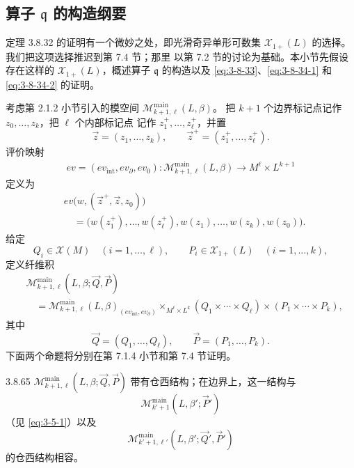 
\subsection{算子 \texorpdfstring{$\mathfrak q$}{q} 的构造纲要}
\label{subsec:3-8-6}

定理 3.8.32 的证明有一个微妙之处，即光滑奇异单形可数集
$\mathcal X_{1+}(L)$ 的选择。我们把这项选择推迟到第 7.4 节；那里
以第 7.2 节的讨论为基础。本小节先假设存在这样的
$\mathcal X_{1+}(L)$，概述算子 $\mathfrak q$ 的构造以及
\eqref{eq:3-8-33}、\eqref{eq:3-8-34-1} 和
\eqref{eq:3-8-34-2} 的证明。

考虑第 2.1.2 小节引入的模空间
$\mathcal M_{k+1,\ell}^{\mathrm{main}}(L,\beta)$。
把 $k+1$ 个边界标记点记作 $z_0,\ldots,z_k$，把 $\ell$ 个内部标记点
记作 $z_1^+,\ldots,z_\ell^+$，并置
\[
 \vec z=(z_1,\ldots,z_k),
 \qquad
 \vec z^+=(z_1^+,\ldots,z_\ell^+).
\]
评价映射
\[
\begin{aligned}
 ev=(ev_{\mathrm{int}},ev_\partial,ev_0)\colon
 \mathcal M_{k+1,\ell}^{\mathrm{main}}(L,\beta)
 \longrightarrow M^\ell\times L^{k+1}
\end{aligned}
\]
定义为
\[
\begin{aligned}
 &ev\bigl(w,(\vec z^+,\vec z,z_0)\bigr)\\
 &\quad=
 \bigl(
 w(z_1^+),\ldots,w(z_\ell^+),
 w(z_1),\ldots,w(z_k),w(z_0)
 \bigr).
\end{aligned}
\]
给定
\[
 Q_i\in\mathcal X(M)\quad(i=1,\ldots,\ell),
 \qquad
 P_i\in\mathcal X_{1+}(L)\quad(i=1,\ldots,k),
\]
定义纤维积
\[
\begin{aligned}
 &\mathcal M_{k+1,\ell}^{\mathrm{main}}
 (L,\beta;\vec Q,\vec P)\\
 &\quad=
 \mathcal M_{k+1,\ell}^{\mathrm{main}}(L,\beta)
 _{(ev_{\mathrm{int}},ev_\partial)}
 \mathbin{\times_{M^\ell\times L^k}}
 (Q_1\times\cdots\times Q_\ell)
 \times(P_1\times\cdots\times P_k),
\end{aligned}
\]
其中
\[
 \vec Q=(Q_1,\ldots,Q_\ell),
 \qquad
 \vec P=(P_1,\ldots,P_k).
\]
下面两个命题将分别在第 7.1.4 小节和第 7.4 节证明。

\begin{proposition}{3.8.65}\label{prop:3-8-65}
$\mathcal M_{k+1,\ell}^{\mathrm{main}}
(L,\beta;\vec Q,\vec P)$ 带有仓西结构；在边界上，这一结构与
\[
 \mathcal M_{k'+1}^{\mathrm{main}}(L,\beta';\vec P')
\]
（见 \eqref{eq:3-5-1}）以及
\[
 \mathcal M_{k'+1,\ell'}^{\mathrm{main}}
 (L,\beta';\vec Q',\vec P')
\]
的仓西结构相容。
\end{proposition}

